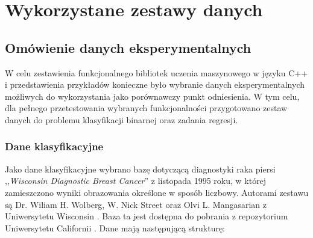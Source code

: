 \chapter{Wykorzystane zestawy danych}
\section{Omówienie danych eksperymentalnych}

W celu zestawienia funkcjonalnego bibliotek uczenia maszynowego w języku C++ i przedstawienia przykładów konieczne było wybranie danych eksperymentalnych możliwych do wykorzystania jako porównawczy punkt odniesienia. W tym celu, dla pełnego przetestowania wybranych funkcjonalności przygotowano zestaw danych do problemu klasyfikacji binarnej oraz zadania regresji.

\subsection{Dane klasyfikacyjne}
	
	 Jako dane klasyfikacyjne wybrano bazę dotyczącą diagnostyki raka piersi ,,\textit{Wisconsin Diagnostic Breast Cancer}'' z listopada 1995 roku, w której zamieszczono wyniki obrazowania określone w sposób liczbowy. Autorami zestawu są Dr. Wiliam H. Wolberg, W. Nick Street oraz Olvi L. Mangasarian z Uniwersytetu Wisconsin \cite{wisconsin}. Baza ta jest dostępna do pobrania z repozytorium Uniwersytetu Californii \cite{Dua:2019}. Dane mają następującą strukturę:
	
